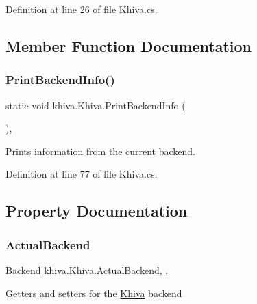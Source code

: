 Definition at line 26 of file Khiva.\+cs.



\subsection{Member Function Documentation}
\mbox{\label{classkhiva_1_1_khiva_ada7dc4e61974d5b14204063e520875c8}} 
\subsubsection{\texorpdfstring{Print\+Backend\+Info()}{PrintBackendInfo()}}
{\footnotesize\ttfamily static void khiva.\+Khiva.\+Print\+Backend\+Info (\begin{DoxyParamCaption}{ }\end{DoxyParamCaption})\hspace{0.3cm}{\ttfamily [inline]}, {\ttfamily [static]}}



Prints information from the current backend. 



Definition at line 77 of file Khiva.\+cs.



\subsection{Property Documentation}
\mbox{\label{classkhiva_1_1_khiva_afe2a41bd88fb117ae27f5504438e25a2}} 
\subsubsection{\texorpdfstring{Actual\+Backend}{ActualBackend}}
{\footnotesize\ttfamily \mbox{\hyperlink{classkhiva_1_1_khiva_a149c512eefcef84e8e94eca721d8cd8f}{Backend}} khiva.\+Khiva.\+Actual\+Backend\hspace{0.3cm}{\ttfamily [static]}, {\ttfamily [get]}, {\ttfamily [set]}}



Getters and setters for the \mbox{\hyperlink{classkhiva_1_1_khiva}{Khiva}} backend 



